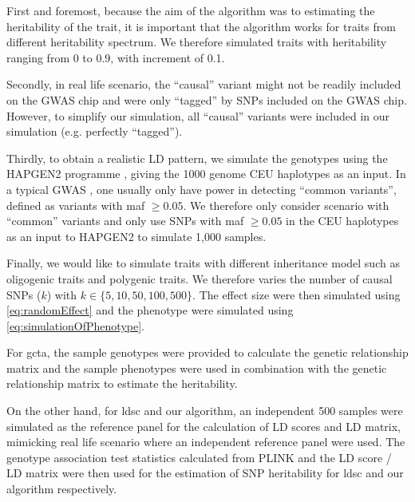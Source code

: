 			First and foremost, because the aim of the algorithm was to estimating the heritability of the trait, it is important that the algorithm works for traits from different heritability spectrum.
			We therefore simulated traits with heritability ranging from 0 to 0.9, with increment of 0.1.
		
			Secondly, in real life scenario, the ``causal'' variant might not be readily included on the \gls{GWAS} chip and were only ``tagged'' by \glspl{SNP} included on the \gls{GWAS} chip.
			However, to simplify our simulation, all ``causal'' variants were included in our simulation (e.g. perfectly ``tagged'').
		
			Thirdly, to obtain a realistic \gls{LD} pattern, we simulate the genotypes using the HAPGEN2 programme \citep{Su2011}, giving the 1000 genome \gls{CEU} haplotypes as an input.
			In a typical \gls{GWAS} , one usually only have power in detecting ``common variants'', defined as variants with \gls{maf} $\ge 0.05$.
			We therefore only consider scenario with ``common'' variants and only use \glspl{SNP} with \gls{maf} $\ge0.05$ in the \gls{CEU} haplotypes as an input to HAPGEN2 to simulate 1,000 samples.
			
			Finally, we would like to simulate traits with different inheritance model such as oligogenic traits and polygenic traits.
			We therefore varies the number of causal \glspl{SNP} ($k$) with $k\in\{5, 10, 50, 100, 500\}$.
			The effect size were then simulated using \cref{eq:randomEffect} and the phenotype were simulated using \cref{eq:simulationOfPhenotype}.
			
			For \gls{gcta}, the sample genotypes were provided to calculate the genetic relationship matrix and the sample phenotypes were used in combination with the genetic relationship matrix to estimate the heritability.
			
			On the other hand, for \gls{ldsc} and our algorithm, an independent 500 samples were simulated as the reference panel for the calculation of \gls{LD} scores and \gls{LD} matrix, mimicking real life scenario where an independent reference panel were used. 
			The genotype association test statistics calculated from PLINK and the \gls{LD} score / \gls{LD} matrix were then used for the estimation of \gls{SNP} heritability for \gls{ldsc} and our algorithm respectively. 
			
